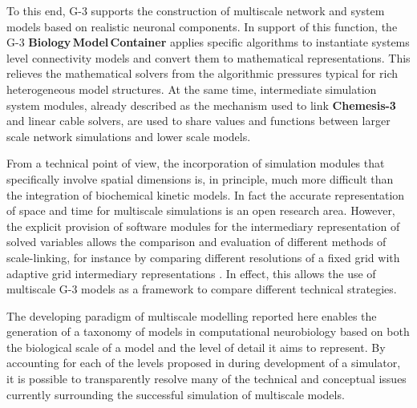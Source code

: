 \documentclass[11pt,3p,twocolumn]{JMN}
\begin{document}


To this end, G-3 supports the construction of multiscale network and system models based on realistic neuronal components.  In support of
this function, the G-3 {\bf Biology\,Model\,Container} applies specific algorithms to instantiate systems level connectivity models and convert them to mathematical representations. This relieves the mathematical solvers from the algorithmic pressures typical for rich heterogeneous model structures.  At the same time, intermediate simulation system modules, already described as the mechanism used to link {\bf Chemesis-3} and linear cable solvers, are used to share values and functions between larger scale network simulations and lower scale models.

From a technical point of view, the incorporation of simulation modules that specifically involve spatial dimensions is, in principle, much more difficult than the integration of biochemical kinetic models. In fact the accurate representation of space and time for multiscale simulations is an open research area.  However, the explicit provision of software modules for the intermediary representation of solved variables allows the comparison and evaluation of different methods of scale-linking, for instance by comparing different resolutions of a fixed grid with adaptive grid intermediary
representations \cite{MO:2009bh}. In effect, this allows the use of multiscale G-3 models as a framework to compare different technical strategies.

The developing paradigm of multiscale modelling reported here enables the generation of a taxonomy of models in computational neurobiology
based on both the biological scale of a model and the level of detail it aims to represent. By accounting for each of the levels proposed in \cite{Marr:1982fk} during development of a simulator, it is possible to transparently resolve many of the technical and conceptual issues currently surrounding the successful simulation of multiscale models.
\end{document}
